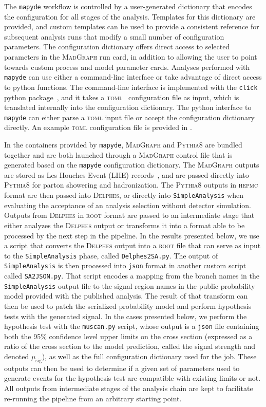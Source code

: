 \documentclass{article}
\newcommand{\mapyde}{\texttt{mapyde}}
\newcommand{\simpleanalysis}{\texttt{SimpleAnalysis}}
\newcommand{\madgraph}{\textsc{MadGraph}}
\newcommand{\pythia}{\textsc{Pythia8}}
\newcommand{\delphes}{\textsc{Delphes}}
\newcommand{\musig}{\ensuremath{\mu_{\mathrm{sig}}}}
\newcommand{\hepmc}{\textsc{hepmc}}
\newcommand{\ROOT}{\textsc{root}}
\newcommand{\json}{\texttt{json}}
\newcommand{\toml}{\textsc{toml}}
\begin{document}
The \mapyde{} workflow is controlled by a user-generated dictionary that encodes the configuration for all stages of the analysis.  Templates for this dictionary are provided, and custom templates can be used to provide a consistent reference for subsequent analysis runs that modify a small number of configuration parameters.  The configuration dictionary offers direct access to selected parameters in the \madgraph{} run card, in addition to allowing the user to point towards custom process and model parameter cards.  Analyses performed with \mapyde{} can use either a command-line interface or take advantage of direct access to python functions.  The command-line interface is implemented with the \texttt{click} python package~\cite{click}, and it takes a \toml{}~\cite{toml} configuration file as input, which is translated internally into the configuration dictionary.  The python interface to \mapyde{} can either parse a \toml{} input file or accept the configuration dictionary directly.  An example \toml{} configuration file is provided in .

In the containers provided by \mapyde, \madgraph{} and \pythia{} are bundled together and are both launched through a \madgraph{} control file that is generated based on the \mapyde{} configuration dictionary.  The \madgraph{} outputs are stored as Les Houches Event (LHE) records~\cite{Alwall:2006yp}, and are passed directly into \pythia{} for parton showering and hadronization.  The \pythia{} outputs in \hepmc{} format are then passed into \delphes{}, or directly into \simpleanalysis{} when evaluating the acceptance of an analysis selection without detector simulation.  Outputs from \delphes{} in \ROOT{} format are passed to an intermediate stage that either analyzes the \delphes{} output or transforms it into a format able to be processed by the next step in the pipeline.  In the results presented below, we use a script that converts the \delphes{} output into a \ROOT{} file that can serve as input to the \simpleanalysis{} phase, called \texttt{Delphes2SA.py}.  The output of \simpleanalysis{} is then processed into \json{} format in another custom script called \texttt{SA2JSON.py}.  That script encodes a mapping from the branch names in the \simpleanalysis{} output file to the signal region names in the public probability model provided with the published analysis.  The result of that transform can then be used to patch the serialized probability model and perform hypothesis tests with the generated signal.  In the cases presented below, we perform the hypothesis test with the \texttt{muscan.py} script, whose output is a \json{} file containing both the 95\% confidence level upper limits on the cross section (expressed as a ratio of the cross section to the model prediction, called the signal strength and denoted \musig), as well as the full configuration dictionary used for the job.  These outputs can then be used to determine if a given set of parameters used to generate events for the hypothesis test are compatible with existing limits or not.  All outputs from intermediate stages of the analysis chain are kept to facilitate re-running the pipeline from an arbitrary starting point.
\end{document}
